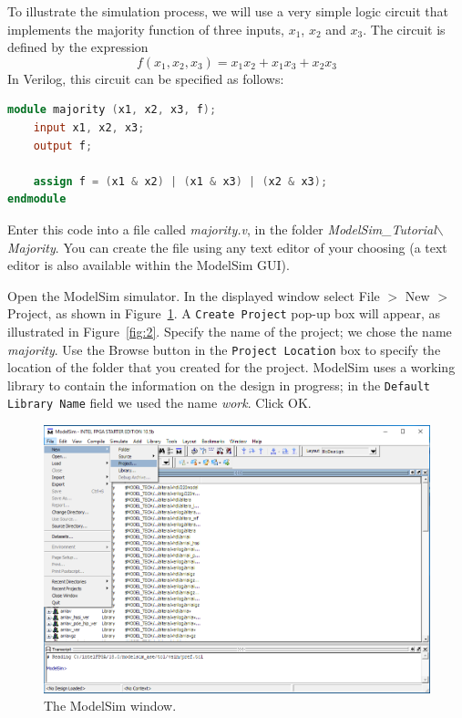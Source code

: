 \documentclass[11pt, twoside, pdftex]{article}
\begin{document}
To illustrate the simulation process, we will use a very simple logic circuit that 
implements the majority function of three inputs, $x_1$, $x_2$ and $x_3$. The circuit
is defined by the expression
$$
f(x_1, x_2, x_3) = x_1 x_2 + x_1 x_3 + x_2 x_3
$$
\noindent
In Verilog, this circuit can be specified as follows:
~\\
\begin{lstlisting}[language=Verilog]
module majority (x1, x2, x3, f);
    input x1, x2, x3;
    output f;

    assign f = (x1 & x2) | (x1 & x3) | (x2 & x3);
endmodule
\end{lstlisting}
\noindent
Enter this code into a file called {\it majority.v}, in the folder 
{\it ModelSim\_Tutorial$\backslash$Majority}.
You can create the file using any text 
editor of your choosing (a text editor is also available within the ModelSim GUI).

Open the ModelSim simulator. In the displayed window select {\sf File $>$ New $>$ Project},
as shown in Figure~\ref{fig:1}.
A \texttt{Create Project} pop-up box will appear, as illustrated in Figure~\ref{fig:2}. 
Specify the name of the project; we chose the name {\it majority}. 
Use the {\sf Browse} button in the \texttt{Project Location} box to specify the location
of the folder that you created for the project.
ModelSim uses a working library to contain the information on the design 
in progress; in the \texttt{Default Library Name} field we used the name {\it work}.
Click {\sf OK}.

\begin{figure}[H]
   \begin{center}
      \includegraphics[scale=0.65]{figures/figure1.png}
   \caption{The ModelSim window.} 
	 \label{fig:1}
	 \end{center}
\end{figure}
\end{document}
